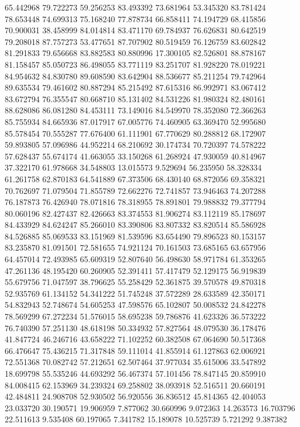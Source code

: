 65.442968
79.722273
59.256253
83.493392
73.681964
53.345320
83.781424
78.653448
74.699313
75.168240
77.878734
66.858411
74.194729
68.415856
70.900031
38.458999
84.014814
83.471170
69.784937
76.626831
80.642519
79.208018
87.757273
53.477651
87.707902
80.519459
76.126759
83.602842
81.291833
79.656668
83.882583
80.880996
17.300105
82.526801
88.878167
81.158457
85.050723
86.498055
83.771119
83.251707
81.928220
78.019221
84.954632
84.830780
89.608590
83.642904
88.536677
85.211254
79.742964
89.635534
79.461602
80.887294
85.215492
87.615316
86.992971
83.067412
83.672794
76.355547
80.668710
85.131402
84.531226
81.980324
82.480161
88.628086
86.081280
84.453111
73.149016
84.549970
78.352080
72.366263
85.755934
84.665936
87.017917
67.005776
74.460905
63.369470
52.995680
85.578454
70.555287
77.676400
61.111901
67.770629
80.288812
68.172907
59.893805
57.096986
44.952214
68.210692
30.174734
70.720397
74.578222
57.628437
55.674174
41.663055
33.150268
61.268924
47.930059
40.814967
37.322170
61.978668
34.548803
13.015573
9.529694
56.235950
58.328334
61.261758
62.870183
64.541889
67.373506
68.430140
68.872056
69.358321
70.762697
71.079504
71.855789
72.662276
72.741857
73.946463
74.207288
76.187873
76.426940
78.071816
78.318955
78.891801
79.988832
79.377794
80.060196
82.427437
82.426663
83.374553
81.906274
83.112119
85.178697
84.433929
84.624247
85.266010
83.390806
83.807332
83.820514
85.586928
84.526885
85.069533
83.151969
81.539596
83.654490
79.896523
80.153157
83.235870
81.091501
72.581655
74.921124
70.161503
73.685165
63.657956
64.457014
72.493985
65.609319
52.807640
56.498630
58.971784
61.353265
47.261136
48.195420
60.260905
52.391411
57.417479
52.129175
56.919839
55.679756
71.047597
38.796625
55.258429
52.361875
39.570578
49.870318
52.935769
61.134152
54.341222
51.745248
37.572289
28.633589
42.350171
54.832943
52.748674
54.605253
47.598576
65.102807
50.008532
24.842278
78.569299
67.272234
51.576015
58.695238
59.786876
41.623326
36.573222
76.740390
57.251130
48.618198
50.334932
57.827564
48.079530
36.178476
41.847724
46.246716
43.658222
71.102252
60.382508
67.064690
50.517368
66.476647
75.436215
71.317848
59.111014
41.855914
61.127863
62.006921
72.551368
70.082742
57.212651
62.507464
37.977034
35.615006
33.547892
18.699798
55.535246
44.693292
56.467374
57.101456
78.847145
20.859910
84.008415
62.153969
34.239324
69.258802
38.093918
52.516511
20.660191
42.484811
24.908708
52.930502
56.920556
36.836512
45.814365
42.404053
23.033720
30.190571
19.906959
7.877062
30.660996
9.072363
14.263573
16.703796
22.511613
9.535408
60.197065
7.341782
15.189078
10.525739
5.721292
9.387382
